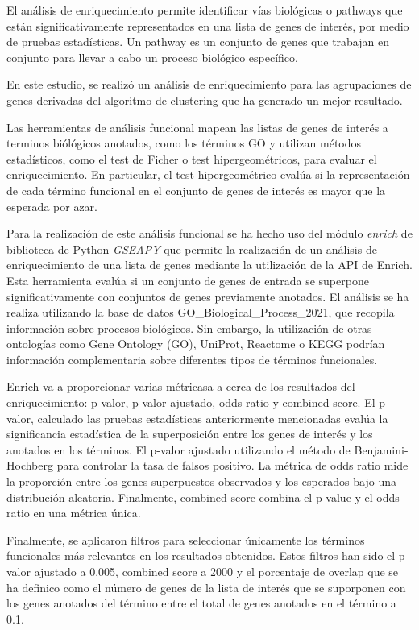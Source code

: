 El análisis de enriquecimiento permite identificar vías biológicas o pathways que están significativamente representados en una lista de genes de interés, por medio de pruebas estadísticas. Un pathway es un conjunto de genes que trabajan en conjunto para llevar a cabo un proceso biológico específico.\cite{Reimand2019}

En este estudio, se realizó un análisis de enriquecimiento para las agrupaciones de genes derivadas del algoritmo de clustering que ha generado un mejor resultado.

Las herramientas de análisis funcional mapean las listas de genes de interés a terminos biólógicos anotados, como los términos GO y utilizan métodos estadísticos, como el test de Ficher o test hipergeométricos,
para evaluar el enriquecimiento.\cite{10.1093/nar/gkn923} En particular, el test hipergeométrico evalúa si la representación de cada término funcional en el conjunto de genes de interés 
es mayor que la esperada por azar. 


Para la realización de este análisis funcional se ha hecho uso del módulo \textit{enrich} de biblioteca de Python \textit{GSEAPY} que permite la realización de un 
análisis de enriquecimiento de una lista de genes mediante la utilización de la API de Enrich. Esta herramienta evalúa si un conjunto de genes de entrada se superpone significativamente con conjuntos de genes previamente anotados. 
El análisis se ha realiza utilizando la base de datos  GO\_Biological\_Process\_2021, que recopila información sobre procesos biológicos. Sin embargo, la utilización de otras ontologías como 
Gene Ontology (GO), UniProt, Reactome o KEGG podrían  información complementaria sobre diferentes tipos de términos funcionales.

Enrich va a proporcionar varias métricasa a cerca de los resultados del enriquecimiento: p-valor, p-valor ajustado, odds ratio y combined score.
El p-valor, calculado las pruebas estadísticas anteriormente mencionadas evalúa la significancia estadística de la superposición entre los genes de interés y los anotados en los términos. El p-valor ajustado
utilizando el método de Benjamini-Hochberg para controlar la tasa de falsos positivo. La métrica de odds ratio mide la proporción entre los genes superpuestos observados y los esperados bajo una distribución aleatoria.
Finalmente, combined score combina el p-value y el odds ratio en una métrica única. \cite{maayanlab_enrichr_help}

Finalmente, se aplicaron filtros para seleccionar únicamente los términos funcionales más relevantes en los resultados obtenidos. Estos filtros han sido el p-valor ajustado a  0.005,
combined score a  2000 y el porcentaje de overlap que se ha definico como  el número de genes de la lista de interés que se suporponen con los genes anotados del término entre el total de genes anotados en el término a 0.1.





